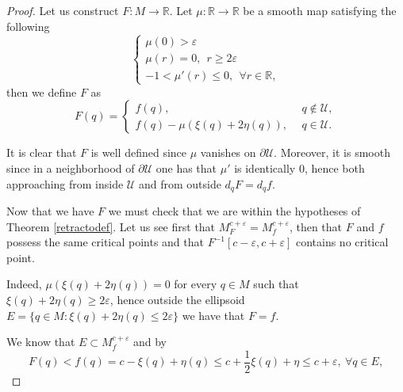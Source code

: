 \begin{proof}
    Let us construct $F:M\to \mathbb{R}$. Let $\mu:\mathbb{R}\to\mathbb{R}$ be a smooth map satisfying the following
    \begin{equation*}
        \begin{cases}
        \mu(0)>\varepsilon\\[3pt]
        \mu(r)=0, ~~r\ge 2\varepsilon\\[3pt]
        -1<\mu'(r)\le 0, ~~\forall r\in \mathbb{R},
        \end{cases}
    \end{equation*}
    then we define $F$ as
    \vspace{1em}
    \begin{equation*}
        F(q)=
        \begin{cases}
        f(q),&~~q\notin \mathcal{U},\\
        f(q)- \mu(\xi(q)+2\eta(q)),&~~q\in \mathcal{U}.
        \end{cases}
    \end{equation*}

    It is clear that $F$ is well defined since $\mu$ vanishes on $\partial\mathcal{U}$. Moreover, it is smooth since in a neighborhood of $\partial\mathcal{U}$ one has that $\mu'$ is identically $0$, hence both approaching from inside $\mathcal{U}$ and from outside $d_qF=d_qf$.

    \bigskip


    Now that we have $F$ we must check that we are within the hypotheses of Theorem \ref{retractodef}. Let us see first that $M_F^{c+\varepsilon}=M_f^{c+\varepsilon}$, then that $F$ and $f$ possess the same critical points and that $F^{-1}[c-\varepsilon,c+\varepsilon]$ contains no critical point.

    Indeed, $\mu(\xi(q)+2\eta(q))=0$ for every $q\in M$ such that $\xi(q)+2\eta(q)\ge 2\varepsilon$, hence outside the ellipsoid $E=\{q\in M:\xi(q)+2\eta(q)\le 2\varepsilon\}$ we have that $F=f$.

    \medskip

    We know that $E\subset M_f^{c+\varepsilon}$ and by
    \begin{equation*}
        F(q)<f(q)=c-\xi(q)+\eta(q)\le c+\frac{1}{2}\xi(q)+\eta\le c + \varepsilon, ~\forall q\in E, %
    \end{equation*}


\end{proof}
